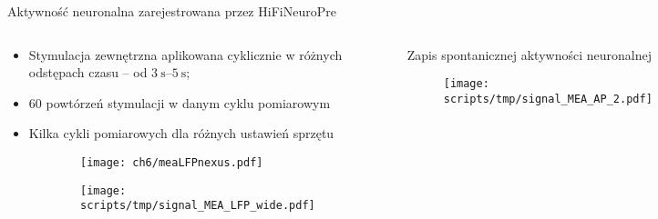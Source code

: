 \begin{frame}{Aktywność neuronalna zarejestrowana przez HiFiNeuroPre}
    \begin{columns}
            \vspace{-1em}

            \begin{block}{}
                {\renewcommand\normalsize{\small}%
                \normalsize
                \begin{itemize}
                    \item Stymulacja zewnętrzna aplikowana cyklicznie w różnych odstępach czasu -- od $\SIrange{3}{5}{\second}$;
                    \item 60 powtórzeń stymulacji w danym cyklu pomiarowym 
                    \item Kilka cykli pomiarowych dla różnych ustawień sprzętu
        
                \end{itemize}
                }
                \vspace{-1em}
                \begin{figure}[H]
                
                
                    \begin{subfigure}{0.25\textwidth}
                        \texttt{[image: ch6/meaLFPnexus.pdf]}
                    \end{subfigure}
                        \hspace{-2em}
                    \begin{subfigure}{0.7\textwidth}
                        \texttt{[image: scripts/tmp/signal\_MEA\_LFP\_wide.pdf]}
                    \end{subfigure}
                \end{figure}
            \end{block}
        \vspace{-1em}

        \begin{block}{Zapis spontanicznej aktywności neuronalnej}
            \begin{figure}[H]
                \centering
                \texttt{[image: scripts/tmp/signal\_MEA\_AP\_2.pdf]}
        \end{figure}
        \end{block}


\end{columns}
\end{frame}
